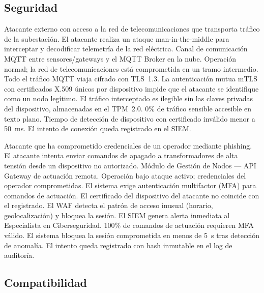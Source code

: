\documentclass[12pt, letterpaper]{article}
\begin{document}
\subsection{Seguridad}

  {Atacante externo con acceso a la red de telecomunicaciones que transporta tráfico
   de la subestación.}
  {El atacante realiza un ataque man-in-the-middle para interceptar y decodificar
   telemetría de la red eléctrica.}
  {Canal de comunicación MQTT entre sensores/gateways y el MQTT Broker en la nube.}
  {Operación normal; la red de telecomunicaciones está comprometida en un tramo
   intermedio.}
  {Todo el tráfico MQTT viaja cifrado con TLS~1.3. La autenticación mutua mTLS con
   certificados X.509 únicos por dispositivo impide que el atacante se identifique como
   un nodo legítimo. El tráfico interceptado es ilegible sin las claves privadas del
   dispositivo, almacenadas en el TPM~2.0.}
  {0\% de tráfico sensible accesible en texto plano. Tiempo de detección de dispositivo
   con certificado inválido menor a 50~ms. El intento de conexión queda registrado en
   el SIEM.}

  {Atacante que ha comprometido credenciales de un operador mediante phishing.}
  {El atacante intenta enviar comandos de apagado a transformadores de alta tensión
   desde un dispositivo no autorizado.}
  {Módulo de Gestión de Nodos --- API Gateway de actuación remota.}
  {Operación bajo ataque activo; credenciales del operador comprometidas.}
  {El sistema exige autenticación multifactor (MFA) para comandos de actuación. El
   certificado del dispositivo del atacante no coincide con el registrado. El WAF
   detecta el patrón de acceso inusual (horario, geolocalización) y bloquea la sesión.
   El SIEM genera alerta inmediata al Especialista en Ciberseguridad.}
  {100\% de comandos de actuación requieren MFA válido. El sistema bloquea la sesión
   comprometida en menos de 5~s tras detección de anomalía. El intento queda registrado
   con hash inmutable en el log de auditoría.}

\subsection{Compatibilidad}
\end{document}
